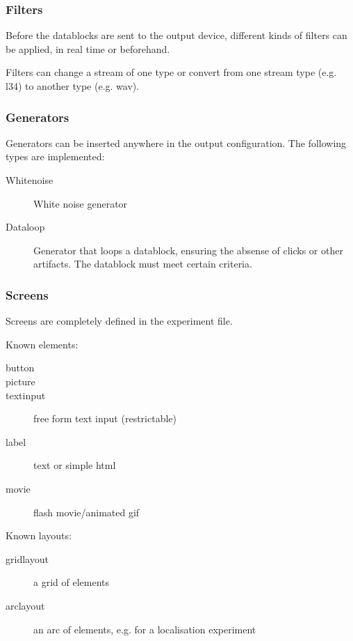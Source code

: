 \documentclass[a4paper,12pt]{article}
\begin{document}
\subsubsection{Filters}

Before the datablocks are sent to the output device, different kinds of filters can be applied, in real time or beforehand.

Filters can change a stream of one type or convert from one stream type (e.g. l34) to another type (e.g. wav). 

\subsubsection{Generators}

Generators can be inserted anywhere in the output configuration. The following types are implemented:

\begin{description}
\item[Whitenoise] White noise generator
\item[Dataloop] Generator that loops a datablock, ensuring the absense of clicks or other artifacts. The datablock must meet certain criteria.
\end{description}


\subsubsection{Screens}

Screens are completely defined in the experiment file. 

Known elements:

\begin{description}
\item[button]
\item[picture]
\item[textinput] free form text input (restrictable)
\item[label] text or simple html
\item[movie] flash movie/animated gif
\end{description}

Known layouts:

\begin{description}
\item[gridlayout] a grid of elements
\item[arclayout] an arc of elements, e.g. for a localisation experiment
\end{description}
\end{document}
